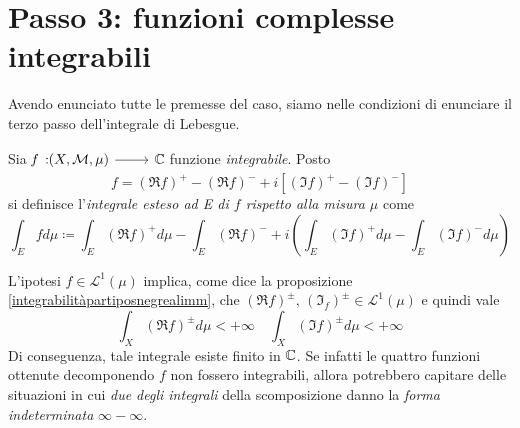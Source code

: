 \section{Passo 3: funzioni complesse integrabili}
Avendo enunciato tutte le premesse del caso, siamo nelle condizioni di enunciare il terzo passo dell'integrale di Lebesgue.
\begin{define}
	Sia $\funz{f}{\left(X,\mathcal{M},\mu\right)}{\complexset}$ funzione \textit{integrabile}. Posto
	\begin{equation*}
		f=\left(\Re f\right)^{+}-\left(\Re f\right)^-+i\left[\left(\Im f\right)^{+}-\left(\Im f\right)^{-}\right]
	\end{equation*}
si definisce l'\textit{integrale esteso ad E di $f$ rispetto alla misura $\mu$} come
\begin{equation}
	\int_Efd\mu\coloneqq\int_E\left(\Re f\right)^{+}d\mu-\int_E\left(\Re f\right)^{-}+i\left(\int_E\left(\Im f\right)^{+}d\mu-\int_E\left(\Im f\right)^{-}d\mu\right)
\end{equation}
\end{define}
\begin{observe}
	L'ipotesi $f\in\mathcal{L}^{1}\left(\mu\right)$ implica, come dice la proposizione \ref{integrabilitàpartiposnegrealimm}, che $\left(\Re f\right)^{\pm}$, $\left(\Im_f\right)^{\pm}\in\mathcal{L}^1\left(\mu\right)$ e quindi vale
	\begin{equation*}
		\int_X\left(\Re f\right)^{\pm}d\mu<+\infty\quad \int_X\left(\Im f\right)^{\pm}d\mu<+\infty
	\end{equation*}
	Di conseguenza, tale integrale esiste finito in $\mathbb{C}$. Se infatti le quattro funzioni ottenute decomponendo $f$ non fossero integrabili, allora potrebbero capitare delle situazioni in cui \textit{due degli integrali} della scomposizione danno la \textit{forma indeterminata} $\infty-\infty$.
\end{observe}
